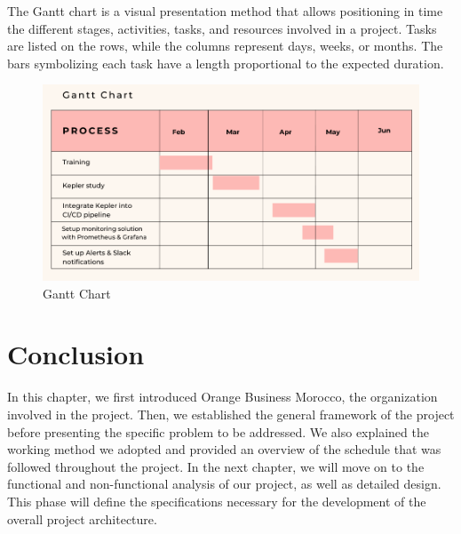 The Gantt chart is a visual presentation method that allows positioning in time the different stages, activities, tasks, and resources involved in a project. Tasks are listed on the rows, while the columns represent days, weeks, or months. The bars symbolizing each task have a length proportional to the expected duration.
\begin{figure}[H]
    \centering
    \includegraphics[width=16cm]{Figures/gantt-chart.png}
    \caption{Gantt Chart}
\end{figure}
\section{Conclusion}
In this chapter, we first introduced Orange Business Morocco, the organization involved in the project. Then, we established the general framework of the project before presenting the specific problem to be addressed. We also explained the working method we adopted and provided an overview of the schedule that was followed throughout the project. In the next chapter, we will move on to the functional and non-functional analysis of our project, as well as detailed design. This phase will define the specifications necessary for the development of the overall project architecture.